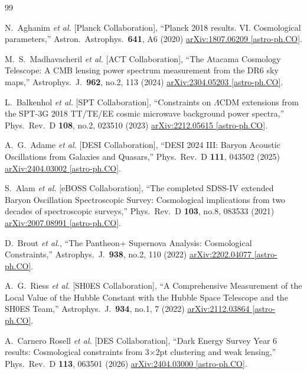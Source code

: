 \vspace{0.5cm}
\begin{thebibliography}{99}

N.~Aghanim {\it et al.} [Planck Collaboration],
``Planck 2018 results. VI. Cosmological parameters,''
Astron.\ Astrophys.\  {\bf 641}, A6 (2020)
\href{https://arxiv.org}{arXiv:1807.06209 [astro-ph.CO]}.

M.~S.~Madhavacheril {\it et al.} [ACT Collaboration],
``The Atacama Cosmology Telescope: A CMB lensing power spectrum measurement from the DR6 sky maps,''
Astrophys.\ J.\  {\bf 962}, no.2, 113 (2024)
\href{https://arxiv.org}{arXiv:2304.05203 [astro-ph.CO]}.

L.~Balkenhol {\it et al.} [SPT Collaboration],
``Constraints on \(\Lambda\)CDM extensions from the SPT-3G 2018 TT/TE/EE cosmic microwave background power spectra,''
Phys.\ Rev.\ D {\bf 108}, no.2, 023510 (2023)
\href{https://arxiv.org}{arXiv:2212.05615 [astro-ph.CO]}.

A.~G.~Adame {\it et al.} [DESI Collaboration],
``DESI 2024 III: Baryon Acoustic Oscillations from Galaxies and Quasars,''
Phys.\ Rev.\ D {\bf 111}, 043502 (2025)
\href{https://arxiv.org}{arXiv:2404.03002 [astro-ph.CO]}.

S.~Alam {\it et al.} [eBOSS Collaboration],
``The completed SDSS-IV extended Baryon Oscillation Spectroscopic Survey: Cosmological implications from two decades of spectroscopic surveys,''
Phys.\ Rev.\ D {\bf 103}, no.8, 083533 (2021)
\href{https://arxiv.org}{arXiv:2007.08991 [astro-ph.CO]}.

D.~Brout {\it et al.},
``The Pantheon+ Supernova Analysis: Cosmological Constraints,''
Astrophys.\ J.\  {\bf 938}, no.2, 110 (2022)
\href{https://arxiv.org}{arXiv:2202.04077 [astro-ph.CO]}.

A.~G.~Riess {\it et al.} [SH0ES Collaboration],
``A Comprehensive Measurement of the Local Value of the Hubble Constant with the Hubble Space Telescope and the SH0ES Team,''
Astrophys.\ J.\  {\bf 934}, no.1, 7 (2022)
\href{https://arxiv.org}{arXiv:2112.03864 [astro-ph.CO]}.

A.~Carnero Rosell {\it et al.} [DES Collaboration],
``Dark Energy Survey Year 6 results: Cosmological constraints from 3\(\times\)2pt clustering and weak lensing,''
Phys.\ Rev.\ D {\bf 113}, 063501 (2026)
\href{https://arxiv.org}{arXiv:2404.03000 [astro-ph.CO]}.

\end{thebibliography}
